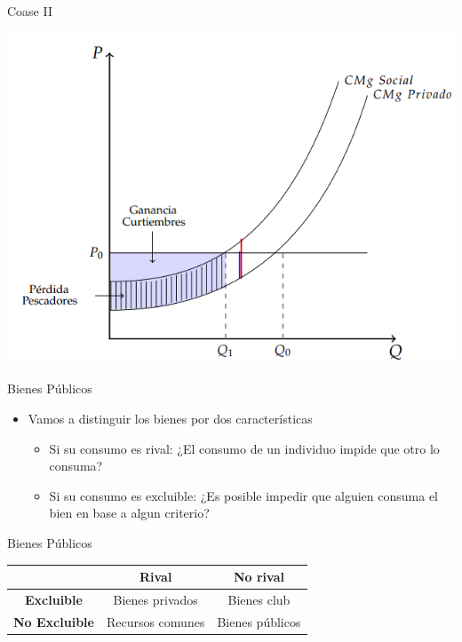 \documentclass{beamer}
\begin{document}
\begin{frame}{Coase II}
    \begin{center}
        \includegraphics[scale=0.7]{../Figures/C25.7.png}
    \end{center}
\end{frame}

\begin{frame}{Bienes Públicos}
\begin{itemize}
    \item Vamos a distinguir los bienes por dos características
    \begin{itemize}
        \item Si su consumo es rival: ¿El consumo de un individuo impide que otro lo consuma?
        \item Si su consumo es excluible: ¿Es posible impedir que alguien consuma el bien en base a algun criterio?
    \end{itemize}
\end{itemize}
\end{frame}

\begin{frame}{Bienes Públicos}
\begin{table}[]
    \centering
    \begin{tabular}{|c|c|c|}
\hline
                      & \textbf{Rival}   & \textbf{No rival} \\ \hline
\textbf{Excluible}    & Bienes privados  & Bienes club       \\ \hline
\textbf{No Excluible} & Recursos comunes & Bienes públicos   \\ \hline
\end{tabular}
\end{table}
\end{frame}

\end{document}
